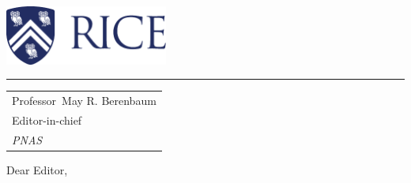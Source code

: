 \documentclass{article}
\begin{document}

\includegraphics[width=0.4\textwidth]{Rice_Logo_280_Blue.pdf} %

\vspace{-1em} %

\rule{\linewidth}{1pt} %

\bigskip\bigskip %



\bigskip %


\begin{tabular}{@{} l}
	Professor\ May R. Berenbaum \\
	Editor-in-chief \\
	\textit{PNAS}
\end{tabular}

\bigskip %

Dear Editor,

\bigskip %

\end{document}

